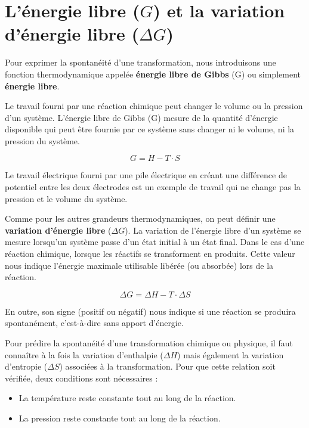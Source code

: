 \documentclass[
  11pt,
  a4paper,
  openany]{book}
\providecommand{\tightlist}{%
  \setlength{\itemsep}{0pt}\setlength{\parskip}{0pt}}
\begin{document}
\section{\texorpdfstring{L'énergie libre (\(G\)) et la variation d'énergie libre (\(\Delta G\))}{L'énergie libre (G) et la variation d'énergie libre (\textbackslash Delta G)}}\label{luxe9nergie-libre-g-et-la-variation-duxe9nergie-libre-delta-g}

Pour exprimer la spontanéité d'une transformation, nous introduisons une fonction thermodynamique appelée \textbf{énergie libre de Gibbs} (G) ou simplement \textbf{énergie libre}.

Le travail fourni par une réaction chimique peut changer le volume ou la pression d'un système. L'énergie libre de Gibbs (G) mesure de la quantité d'énergie disponible qui peut être fournie par ce système sans changer ni le volume, ni la pression du système.

\[
G = H - T \cdot S
\]

Le travail électrique fourni par une pile électrique en créant une différence de potentiel entre les deux électrodes est un exemple de travail qui ne change pas la pression et le volume du système.

Comme pour les autres grandeurs thermodynamiques, on peut définir une \textbf{variation d'énergie libre} (\(\Delta G\)). La variation de l'énergie libre d'un système se mesure lorsqu'un système passe d'un état initial à un état final. Dans le cas d'une réaction chimique, lorsque les réactifs se transforment en produits. Cette valeur nous indique l'énergie maximale utilisable libérée (ou absorbée) lors de la réaction.

\[
\Delta G = \Delta H - T \cdot \Delta S
\]

En outre, son signe (positif ou négatif) nous indique si une réaction se produira spontanément, c'est-à-dire sans apport d'énergie.

\clearpage

Pour prédire la spontanéité d'une transformation chimique ou physique, il faut connaître à la fois la variation d'enthalpie (\(\Delta H\)) mais également la variation d'entropie (\(\Delta S\)) associées à la transformation. Pour que cette relation soit vérifiée, deux conditions sont nécessaires :

\begin{itemize}
\tightlist
\item
  La température reste constante tout au long de la réaction.
\item
  La pression reste constante tout au long de la réaction.
\end{itemize}
\end{document}
